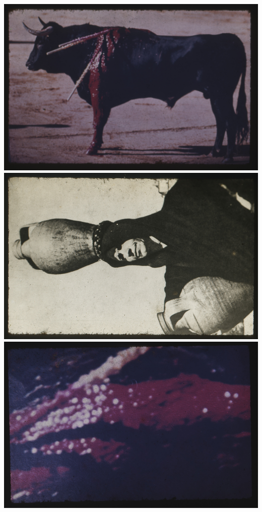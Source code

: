 \includegraphics[width=\columnwidth]{media/IMAGEM29.jpg}
\includegraphics[width=\columnwidth]{media/IMAGEM30.jpg}
\includegraphics[width=\columnwidth]{media/IMAGEM31.jpg}
